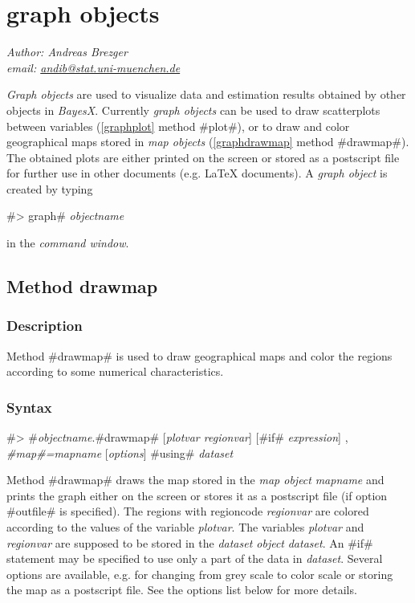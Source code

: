 \chapter{graph objects}
\label{graphobj}  

{\em Author: Andreas Brezger} \\
{\em email: \href{mailto:andib@stat.uni-muenchen.de}{andib@stat.uni-muenchen.de}}\\
\vspace{0.3cm}


{\em Graph objects} are used to visualize data and estimation
results obtained by other objects in {\em BayesX}. Currently {\em
graph objects} can be used to draw scatterplots between variables
(\autoref{graphplot} method #plot#), or to draw and color
geographical maps stored in {\em map objects}
(\autoref{graphdrawmap} method #drawmap#). The obtained plots are
either printed on the screen or stored as a postscript file for
further use in other documents (e.g. \LaTeX\/ documents).
A {\em graph object} is created by typing

#> graph# {\em objectname}

in the {\em command window}.

\section{Method drawmap}
\label{graphdrawmap} 

\subsection*{Description}

Method #drawmap# is used to draw geographical maps and color the
regions according to some numerical characteristics.

\subsection*{Syntax}

#> #{\em objectname}.#drawmap#  [{\em plotvar regionvar}]
[#if# {\em expression}] , {\em #map#=mapname} [{\em options}] #using# {\em dataset}

Method #drawmap# draws the map stored in the {\em map object} {\em
mapname} and prints the graph either on the screen or stores it as
a postscript file (if option #outfile# is specified). The regions
with regioncode {\em regionvar} are colored according to the
values of the variable {\em plotvar}. The variables {\em plotvar}
and {\em regionvar} are supposed to be stored in the {\em dataset
object} {\em dataset}. An #if# statement may be specified to use
only a part of the data in {\em dataset}. Several options are
available, e.g. for changing from grey scale to color scale or
storing the map as a postscript file. See the options list below
for more details.

